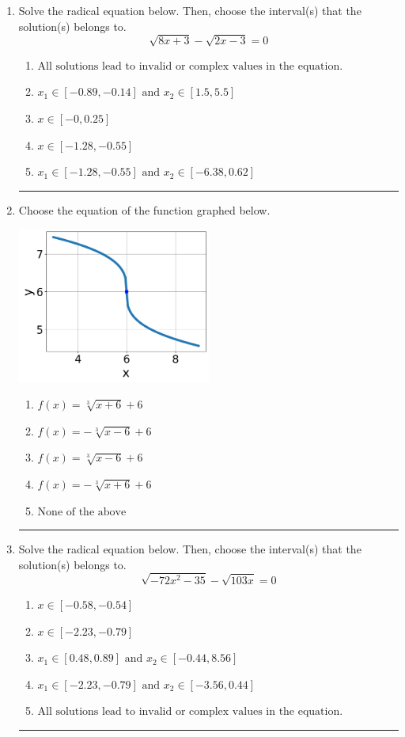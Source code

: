 \documentclass[14pt]{extbook}
\newcommand{\litem}[1]{\item#1\hspace*{-1cm}\rule{\textwidth}{0.4pt}}
\begin{document}
\begin{enumerate}
{\begin{enumerate}[label=\Alph*.]
\end{enumerate} }
\litem{
Solve the radical equation below. Then, choose the interval(s) that the solution(s) belongs to.\[ \sqrt{8 x + 3} - \sqrt{2 x - 3} = 0 \]\begin{enumerate}[label=\Alph*.]
\item \( \text{All solutions lead to invalid or complex values in the equation.} \)
\item \( x_1 \in [-0.89, -0.14] \text{ and } x_2 \in [1.5,5.5] \)
\item \( x \in [-0,0.25] \)
\item \( x \in [-1.28,-0.55] \)
\item \( x_1 \in [-1.28, -0.55] \text{ and } x_2 \in [-6.38,0.62] \)

\end{enumerate} }
\litem{
Choose the equation of the function graphed below.
\begin{center}
    \includegraphics[width=0.5\textwidth]{../Figures/radicalGraphToEquationA.png}
\end{center}
\begin{enumerate}[label=\Alph*.]
\item \( f(x) = \sqrt[3]{x + 6} + 6 \)
\item \( f(x) = - \sqrt[3]{x - 6} + 6 \)
\item \( f(x) = \sqrt[3]{x - 6} + 6 \)
\item \( f(x) = - \sqrt[3]{x + 6} + 6 \)
\item \( \text{None of the above} \)

\end{enumerate} }
\litem{
Solve the radical equation below. Then, choose the interval(s) that the solution(s) belongs to.\[ \sqrt{-72 x^2 - 35} - \sqrt{103 x} = 0 \]\begin{enumerate}[label=\Alph*.]
\item \( x \in [-0.58,-0.54] \)
\item \( x \in [-2.23,-0.79] \)
\item \( x_1 \in [0.48, 0.89] \text{ and } x_2 \in [-0.44,8.56] \)
\item \( x_1 \in [-2.23, -0.79] \text{ and } x_2 \in [-3.56,0.44] \)
\item \( \text{All solutions lead to invalid or complex values in the equation.} \)


\end{enumerate}}
\end{enumerate}
\end{document}
